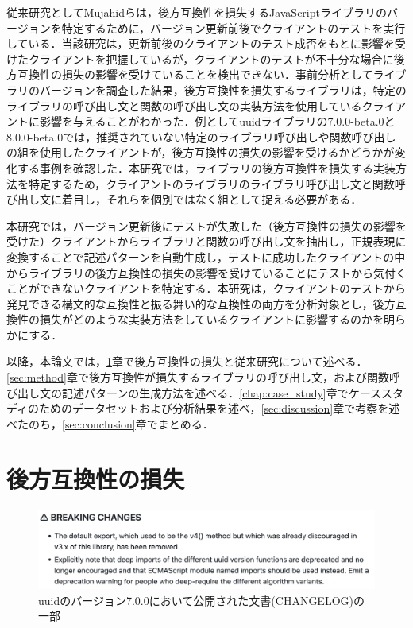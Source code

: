 \documentclass[11pt]{jreport}
\begin{document}
従来研究としてMujahidらは，後方互換性を損失するJavaScriptライブラリのバージョンを特定するために，バージョン更新前後でクライアントのテストを実行している\cite{mujahid}．当該研究は，更新前後のクライアントのテスト成否をもとに影響を受けたクライアントを把握しているが，クライアントのテストが不十分な場合に後方互換性の損失の影響を受けていることを検出できない．事前分析としてライブラリのバージョンを調査した結果，後方互換性を損失するライブラリは，特定のライブラリの呼び出し文と関数の呼び出し文の実装方法を使用しているクライアントに影響を与えることがわかった．例としてuuidライブラリの7.0.0-beta.0と8.0.0-beta.0では，推奨されていない特定のライブラリ呼び出しや関数呼び出しの組を使用したクライアントが，後方互換性の損失の影響を受けるかどうかが変化する事例を確認した．本研究では，ライブラリの後方互換性を損失する実装方法を特定するため，クライアントのライブラリのライブラリ呼び出し文と関数呼び出し文に着目し，それらを個別ではなく組として捉える必要がある．

本研究では，バージョン更新後にテストが失敗した（後方互換性の損失の影響を受けた）クライアントからライブラリと関数の呼び出し文を抽出し，正規表現に変換することで記述パターンを自動生成し，テストに成功したクライアントの中からライブラリの後方互換性の損失の影響を受けていることにテストから気付くことができないクライアントを特定する．本研究は，クライアントのテストから発見できる構文的な互換性と振る舞い的な互換性の両方を分析対象とし，後方互換性の損失がどのような実装方法をしているクライアントに影響するのかを明らかにする．

以降，本論文では，\ref{chap:intro}章で後方互換性の損失と従来研究について述べる．\ref{sec:method}章で後方互換性が損失するライブラリの呼び出し文，および関数呼び出し文の記述パターンの生成方法を述べる．\ref{chap:case_study}章でケーススタディのためのデータセットおよび分析結果を述べ，\ref{sec:discussion}章で考察を述べたのち，\ref{sec:conclusion}章でまとめる．




\chapter{後方互換性の損失}\label{chap:intro}

\begin{figure}[t]
\centerline{\includegraphics[width=0.9\linewidth]{BSthesis2024_Iida_fig/InsufficientDocumentation.pdf}}
\caption{uuidのバージョン7.0.0において公開された文書(CHANGELOG)の一部}
\label{fig:Insufficient_documentation}
\end{figure}
\end{document}

